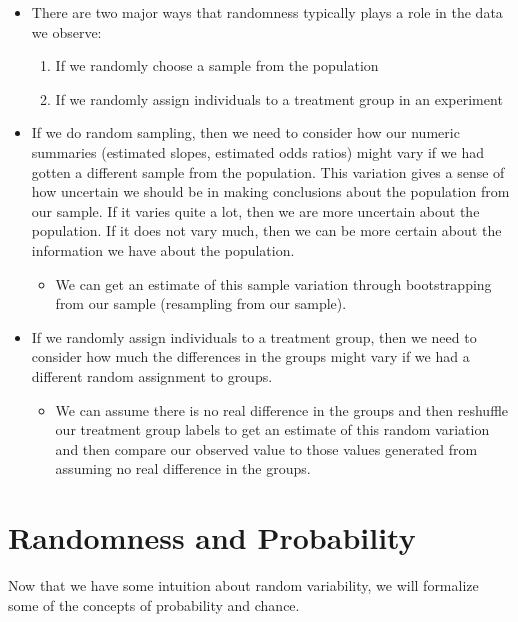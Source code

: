 \documentclass[
]{book}
\providecommand{\tightlist}{%
  \setlength{\itemsep}{0pt}\setlength{\parskip}{0pt}}
\begin{document}
\begin{itemize}
\item
  There are two major ways that randomness typically plays a role in the data we observe:

  \begin{enumerate}
  \def\labelenumi{\arabic{enumi}.}
  \tightlist
  \item
    If we randomly choose a sample from the population
  \item
    If we randomly assign individuals to a treatment group in an experiment
  \end{enumerate}
\item
  If we do random sampling, then we need to consider how our numeric summaries (estimated slopes, estimated odds ratios) might vary if we had gotten a different sample from the population. This variation gives a sense of how uncertain we should be in making conclusions about the population from our sample. If it varies quite a lot, then we are more uncertain about the population. If it does not vary much, then we can be more certain about the information we have about the population.

  \begin{itemize}
  \tightlist
  \item
    We can get an estimate of this sample variation through bootstrapping from our sample (resampling from our sample).
  \end{itemize}
\item
  If we randomly assign individuals to a treatment group, then we need to consider how much the differences in the groups might vary if we had a different random assignment to groups.

  \begin{itemize}
  \tightlist
  \item
    We can assume there is no real difference in the groups and then reshuffle our treatment group labels to get an estimate of this random variation and then compare our observed value to those values generated from assuming no real difference in the groups.
  \end{itemize}
\end{itemize}

\chapter{Randomness and Probability}\label{randomness-and-probability}

Now that we have some intuition about random variability, we will formalize some of the concepts of probability and chance.
\end{document}
